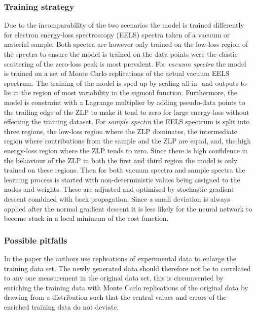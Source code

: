 \documentclass[a4paper]{scrartcl}
\begin{document}
\subsubsection*{Training strategy}
Due to the incomparability of the two scenarios the model is trained differently for electron energy-loss spectroscopy (EELS) spectra taken of a vacuum or material sample. Both spectra are however only trained on the low-loss region of the spectra to ensure the model is trained on the data points were the elastic scattering of the zero-loss peak is most prevalent.
For \textit{vacuum spectra} the model is trained on a set of Monte Carlo replications of the actual vacuum EELS spectrum. The training of the model is sped up by scaling all in- and outputs to lie in the region of most variability in the sigmoid function. Furthermore, the model is constraint with a Lagrange multiplier by adding pseudo-data points to the trailing edge of the ZLP to make it tend to zero for large energy-loss without effecting the training dataset.
For \textit{sample spectra} the EELS spectrum is split into three regions, the low-loss region where the ZLP dominates, the intermediate region where contributions from the sample and the ZLP are equal, and, the high energy-loss region where the ZLP tends to zero. Since there is high confidence in the behaviour of the ZLP in both the first and third region the model is only trained on these regions.
Then for both vacuum spectra and sample spectra the learning process is started with non-deterministic values being assigned to the nodes and weights. These are adjusted and optimised by stochastic gradient descent combined with back propagation. Since a small deviation is always applied after the normal gradient descent it is less likely for the neural network to become stuck in a local minimum of the cost function.

\subsubsection*{Possible pitfalls}
In the paper the authors use replications of experimental data to enlarge the training data set. The newly generated data should therefore not be to correlated to any one measurement in the original data set, this is circumvented by enriching the training data with Monte Carlo replications of the original data by drawing from a distribution such that the central values and errors of the enriched training data do not deviate.
\end{document}
